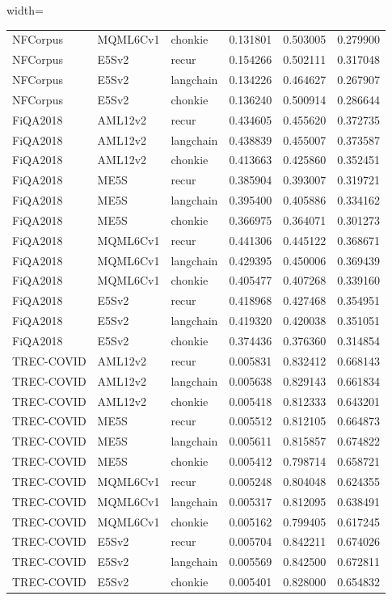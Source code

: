 \begin{table}[t]
\begin{adjustbox}{width=\textwidth}
\begin{tabular}{ll l c c c}
NFCorpus & MQML6Cv1 & chonkie   & 0.131801 & 0.503005 & 0.279900 \\
NFCorpus & E5Sv2    & recur     & 0.154266 & 0.502111 & 0.317048 \\
NFCorpus & E5Sv2    & langchain & 0.134226 & 0.464627 & 0.267907 \\
NFCorpus & E5Sv2    & chonkie   & 0.136240 & 0.500914 & 0.286644 \\
\midrule
FiQA2018 & AML12v2  & recur     & 0.434605 & 0.455620 & 0.372735 \\
FiQA2018 & AML12v2  & langchain & 0.438839 & 0.455007 & 0.373587 \\
FiQA2018 & AML12v2  & chonkie   & 0.413663 & 0.425860 & 0.352451 \\
FiQA2018 & ME5S     & recur     & 0.385904 & 0.393007 & 0.319721 \\
FiQA2018 & ME5S     & langchain & 0.395400 & 0.405886 & 0.334162 \\
FiQA2018 & ME5S     & chonkie   & 0.366975 & 0.364071 & 0.301273 \\
FiQA2018 & MQML6Cv1 & recur     & 0.441306 & 0.445122 & 0.368671 \\
FiQA2018 & MQML6Cv1 & langchain & 0.429395 & 0.450006 & 0.369439 \\
FiQA2018 & MQML6Cv1 & chonkie   & 0.405477 & 0.407268 & 0.339160 \\
FiQA2018 & E5Sv2    & recur     & 0.418968 & 0.427468 & 0.354951 \\
FiQA2018 & E5Sv2    & langchain & 0.419320 & 0.420038 & 0.351051 \\
FiQA2018 & E5Sv2    & chonkie   & 0.374436 & 0.376360 & 0.314854 \\
\midrule
TREC-COVID & AML12v2  & recur     & 0.005831 & 0.832412 & 0.668143 \\
TREC-COVID & AML12v2  & langchain & 0.005638 & 0.829143 & 0.661834 \\
TREC-COVID & AML12v2  & chonkie   & 0.005418 & 0.812333 & 0.643201 \\
TREC-COVID & ME5S     & recur     & 0.005512 & 0.812105 & 0.664873 \\
TREC-COVID & ME5S     & langchain & 0.005611 & 0.815857 & 0.674822 \\
TREC-COVID & ME5S     & chonkie   & 0.005412 & 0.798714 & 0.658721 \\
TREC-COVID & MQML6Cv1 & recur     & 0.005248 & 0.804048 & 0.624355 \\
TREC-COVID & MQML6Cv1 & langchain & 0.005317 & 0.812095 & 0.638491 \\
TREC-COVID & MQML6Cv1 & chonkie   & 0.005162 & 0.799405 & 0.617245 \\
TREC-COVID & E5Sv2    & recur     & 0.005704 & 0.842211 & 0.674026 \\
TREC-COVID & E5Sv2    & langchain & 0.005569 & 0.842500 & 0.672811 \\
TREC-COVID & E5Sv2    & chonkie   & 0.005401 & 0.828000 & 0.654832 \\
\bottomrule
\end{tabular}
\end{adjustbox}
\end{table}


